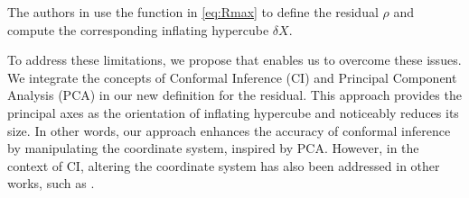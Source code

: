 The authors in \cite{hashemi2024statistical} use the function in \eqref{eq:Rmax} to define the residual $\rho$ and compute the corresponding inflating hypercube $\delta X$. 

To address these limitations, we propose  that enables us to overcome these issues. We integrate the concepts of Conformal Inference (CI) and Principal Component Analysis (PCA) in our new definition for the residual. This approach provides the principal axes as the orientation of inflating hypercube and noticeably reduces its size. In other words, our approach enhances the accuracy of conformal inference by manipulating the coordinate system, inspired by PCA. However, in the context of CI, altering the coordinate system has also been addressed in other works, such as \cite{tumu2024multi,sharma2024pac}.

